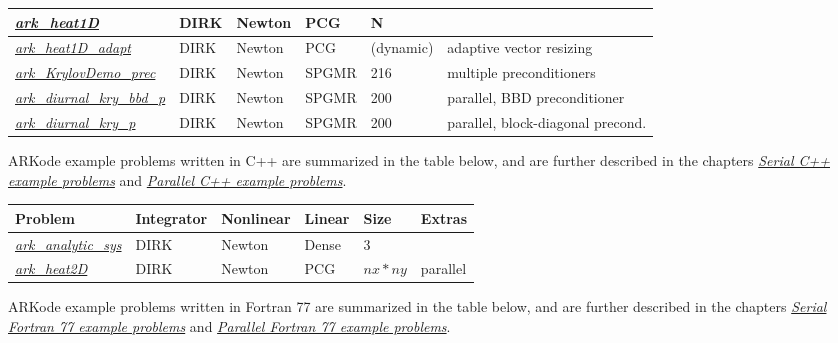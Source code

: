 \documentclass[letterpaper,10pt,english]{sphinxmanual}
\begin{document}
\begin{tabulary}{\linewidth}{|L|L|L|L|L|L|}
{\hyperref[c_serial:ark-heat1d]{\emph{ark\_heat1D}}}
 & 
DIRK
 & 
Newton
 & 
PCG
 & 
N
 & \\\hline

{\hyperref[c_serial:ark-heat1d-adapt]{\emph{ark\_heat1D\_adapt}}}
 & 
DIRK
 & 
Newton
 & 
PCG
 & 
(dynamic)
 & 
adaptive vector resizing
\\\hline

{\hyperref[c_serial:ark-krylovdemo-prec]{\emph{ark\_KrylovDemo\_prec}}}
 & 
DIRK
 & 
Newton
 & 
SPGMR
 & 
216
 & 
multiple preconditioners
\\\hline

{\hyperref[c_parallel:ark-diurnal-kry-bbd-p]{\emph{ark\_diurnal\_kry\_bbd\_p}}}
 & 
DIRK
 & 
Newton
 & 
SPGMR
 & 
200
 & 
parallel, BBD preconditioner
\\\hline

{\hyperref[c_parallel:ark-diurnal-kry-p]{\emph{ark\_diurnal\_kry\_p}}}
 & 
DIRK
 & 
Newton
 & 
SPGMR
 & 
200
 & 
parallel, block-diagonal precond.
\\\hline
\end{tabulary}


ARKode example problems written in C++ are summarized in the table
below, and are further described in the chapters {\hyperref[cpp_serial:serial-cpp]{\emph{Serial C++ example problems}}} and
{\hyperref[cpp_parallel:parallel-cpp]{\emph{Parallel C++ example problems}}}.

\begin{tabulary}{\linewidth}{|L|L|L|L|L|L|}
\hline
\textbf{\relax 
Problem
} & \textbf{\relax 
Integrator
} & \textbf{\relax 
Nonlinear
} & \textbf{\relax 
Linear
} & \textbf{\relax 
Size
} & \textbf{\relax 
Extras
}\\\hline

{\hyperref[cpp_serial:ark-analytic-sys]{\emph{ark\_analytic\_sys}}}
 & 
DIRK
 & 
Newton
 & 
Dense
 & 
3
 & \\\hline

{\hyperref[cpp_parallel:ark-heat2d]{\emph{ark\_heat2D}}}
 & 
DIRK
 & 
Newton
 & 
PCG
 & 
$nx*ny$
 & 
parallel
\\\hline
\end{tabulary}


ARKode example problems written in Fortran 77 are summarized in the table
below, and are further described in the chapters {\hyperref[f77_serial:serial-f77]{\emph{Serial Fortran 77 example problems}}} and
{\hyperref[f77_parallel:parallel-f77]{\emph{Parallel Fortran 77 example problems}}}.
\end{document}
